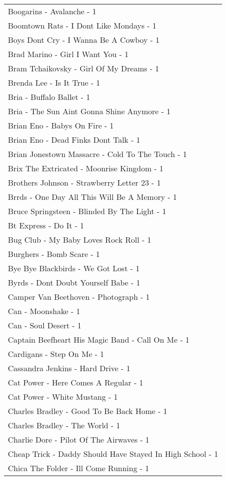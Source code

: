 \documentclass[
]{article}
\begin{document}
\begin{longtable}{l}
Boogarins - Avalanche - 1 \\ 
Boomtown Rats - I Dont Like Mondays - 1 \\ 
Boys Dont Cry - I Wanna Be A Cowboy - 1 \\ 
Brad Marino - Girl I Want You - 1 \\ 
Bram Tchaikovsky - Girl Of My Dreams - 1 \\ 
Brenda Lee - Is It True - 1 \\ 
Bria - Buffalo Ballet - 1 \\ 
Bria - The Sun Aint Gonna Shine Anymore - 1 \\ 
Brian Eno - Babys On Fire - 1 \\ 
Brian Eno - Dead Finks Dont Talk - 1 \\ 
Brian Jonestown Massacre - Cold To The Touch - 1 \\ 
Brix The Extricated - Moonrise Kingdom - 1 \\ 
Brothers Johnson - Strawberry Letter 23 - 1 \\ 
Brrds - One Day All This Will Be A Memory - 1 \\ 
Bruce Springsteen - Blinded By The Light - 1 \\ 
Bt Express - Do It - 1 \\ 
Bug Club - My Baby Loves Rock Roll - 1 \\ 
Burghers - Bomb Scare - 1 \\ 
Bye Bye Blackbirds - We Got Lost - 1 \\ 
Byrds - Dont Doubt Yourself Babe - 1 \\ 
Camper Van Beethoven - Photograph - 1 \\ 
Can - Moonshake - 1 \\ 
Can - Soul Desert - 1 \\ 
Captain Beefheart His Magic Band - Call On Me - 1 \\ 
Cardigans - Step On Me - 1 \\ 
Cassandra Jenkins - Hard Drive - 1 \\ 
Cat Power - Here Comes A Regular - 1 \\ 
Cat Power - White Mustang - 1 \\ 
Charles Bradley - Good To Be Back Home - 1 \\ 
Charles Bradley - The World - 1 \\ 
Charlie Dore - Pilot Of The Airwaves - 1 \\ 
Cheap Trick - Daddy Should Have Stayed In High School - 1 \\ 
Chica The Folder - Ill Come Running - 1 \\ 

\end{longtable}
\end{document}
